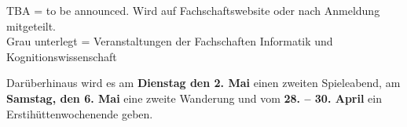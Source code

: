 {\scriptsize TBA = to be announced. Wird auf Fachschaftswebsite oder nach Anmeldung mitgeteilt.} \\
{\scriptsize Grau unterlegt = Veranstaltungen der Fachschaften Informatik und Kognitionswissenschaft }

\normalsize
Darüberhinaus wird es am \textbf{Dienstag den 2. Mai} einen zweiten Spieleabend, am \textbf{Samstag, den 6. Mai} eine zweite Wanderung und vom
\textbf{28. -- 30. April} ein Erstihüttenwochenende geben.

\newpage
\normalsize

